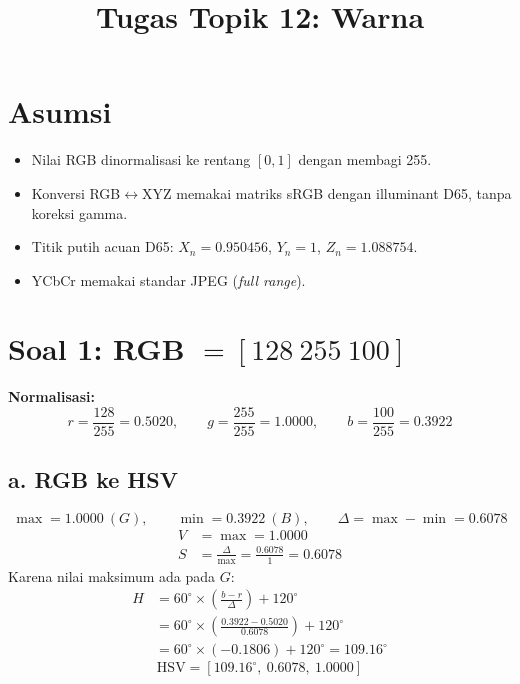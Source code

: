 \documentclass[11pt,a4paper]{article}
\title{Tugas Topik 12: Warna}
\author{}
\date{}
\begin{document}
\maketitle
\vspace{-2.5em}

\section*{Asumsi}
\begin{itemize}
  \item Nilai RGB dinormalisasi ke rentang $[0,1]$ dengan membagi 255.
  \item Konversi RGB$\leftrightarrow$XYZ memakai matriks sRGB dengan illuminant D65, tanpa koreksi gamma.
  \item Titik putih acuan D65: $X_n = 0.950456$, $Y_n = 1$, $Z_n = 1.088754$.
  \item YCbCr memakai standar JPEG (\textit{full range}).
\end{itemize}

\section*{Soal 1: RGB $= [128\ 255\ 100]$}

\textbf{Normalisasi:}
\[
r = \frac{128}{255} = 0.5020,\qquad g = \frac{255}{255} = 1.0000,\qquad b = \frac{100}{255} = 0.3922
\]

\subsection*{a. RGB ke HSV}
\[
\max = 1.0000\ (G),\qquad \min = 0.3922\ (B),\qquad \Delta = \max - \min = 0.6078
\]
\begin{align*}
V &= \max = 1.0000\\
S &= \frac{\Delta}{\max} = \frac{0.6078}{1} = 0.6078
\end{align*}
Karena nilai maksimum ada pada $G$:
\begin{align*}
H &= 60^\circ \times \left(\frac{b - r}{\Delta}\right) + 120^\circ\\
  &= 60^\circ \times \left(\frac{0.3922 - 0.5020}{0.6078}\right) + 120^\circ\\
  &= 60^\circ \times (-0.1806) + 120^\circ = 109.16^\circ
\end{align*}
\[
\boxed{\text{HSV} = [109.16^\circ,\ 0.6078,\ 1.0000]}
\]
\end{document}
